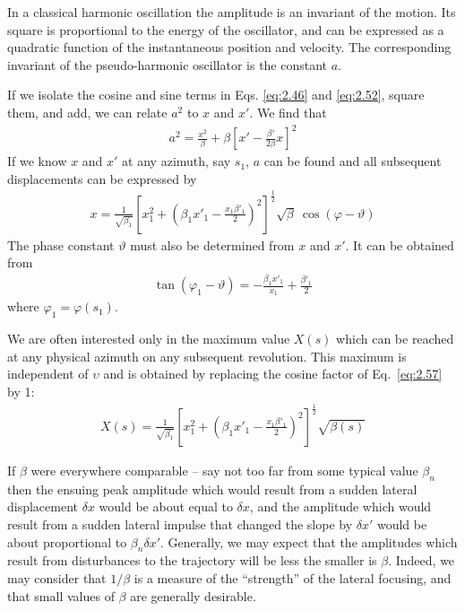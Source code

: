 In a classical harmonic oscillation the amplitude is an invariant of the motion. Its square is proportional to the energy of the oscillator, and can be expressed as a quadratic function of the instantaneous position and velocity. The corresponding invariant of the pseudo-harmonic oscillator is the constant $a$.

If we isolate the cosine and sine terms in Eqs. \eqref{eq:2.46} and \eqref{eq:2.52}, square them, and add, we can relate $a^2$ to $x$ and $x'$. We find that
\begin{align}
	a^2 = \frac{x^2}{\beta} + \beta\left[x'-\frac{\beta'}{2\beta}x\right]^2\label{eq:2.56}
\end{align}
If we know $x$ and $x'$ at any azimuth, say $s_1$, $a$ can be found and all subsequent displacements can be expressed by
\begin{align}
	x = \frac{1}{\sqrt{\beta_1}}\left[x_1^2+\left(\beta_1x'_1-\frac{x_1\beta'_1}{2}\right)^2\right]^\frac{1}{2}\sqrt{\beta}\ \cos(\varphi-\vartheta)\label{eq:2.57}
\end{align}
The phase constant $\vartheta$ must also be determined from $x$ and $x'$. It can be obtained from
\begin{align}
	\tan(\varphi_1 - \vartheta) = -\frac{\beta_1 x'_1}{x_1}+\frac{\beta'_1}{2}
\end{align}
where $\varphi_1 = \varphi(s_1)$.

We are often interested only in the maximum value $X(s)$ which can be reached at any physical azimuth on any subsequent revolution. This maximum is independent of $\upsilon$ and is obtained by replacing the cosine factor of Eq.~\eqref{eq:2.57} by 1:
\begin{align}
	X(s) = \frac{1}{\sqrt{\beta_1}}\left[x_1^2+\left(\beta_1x'_1-\frac{x_1\beta'_1}{2}\right)^2\right]^\frac{1}{2}\sqrt{\beta(s)}
\end{align}

If $\beta$ were everywhere comparable -- say not too far from some typical value $\beta_n$ then the ensuing peak amplitude which would result from a sudden lateral displacement $\delta x$ would be about equal to $\delta x$, and the amplitude which would result from a sudden lateral impulse that changed the slope by $\delta x'$ would be about proportional to $\beta_n \delta x'$. Generally, we may expect that the amplitudes which result from disturbances to the trajectory will be less the smaller is $\beta$. Indeed, we may consider that $1/\beta$ is a measure of the “strength” of the lateral focusing, and that small values of $\beta$ are generally desirable.
